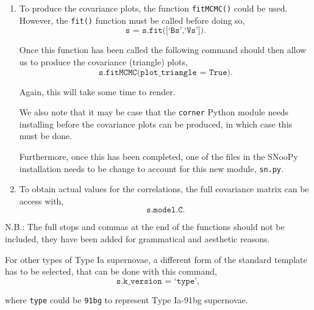 \documentclass[twocolumn]{revtex4}
\begin{document}
{\begin{enumerate}
 It is worth noting that as this is a more complex method, it is sampling multiple probabilities, it will take more time to render a final plot. 
 
 \item To produce the covariance plots, the function \texttt{fitMCMC()} could be used. However, the \texttt{fit()} function must be called before doing so,
 \begin{equation*}
 \texttt{s = s.fit([`Bs',`Vs'])} . 
 \end{equation*}
 
 Once this function has been called the following command should then allow us to produce the covariance (triangle) plots,
 \begin{equation*}
 \texttt{s.fitMCMC(plot\_triangle = True)} . 
 \end{equation*}
 
 Again, this will take some time to render. 
 
 We also note that it may be case that the \texttt{corner} Python module needs installing before the covariance plots can be produced, in which case this must be done. 
 
 Furthermore, once this has been completed, one of the files in the SNooPy installation needs to be change to account for this new module, \texttt{sn.py}.
 
 \item To obtain actual values for the correlations, the full covariance matrix can be access with, 
 \begin{equation*}
 \texttt{s.model.C}.
 \end{equation*}
\end{enumerate}

N.B.: The full stops and commas at the end of the functions should not be included, they have been added for grammatical and aesthetic reasons.

For other types of Type Ia supernovae, a different form of the standard template has to be selected, that can be done with this command,
\begin{equation*}
\texttt{s.k\_version = `type'},
\end{equation*}

where \texttt{type} could be \texttt{91bg} to represent Type Ia-91bg supernovae.

\clearpage

\onecolumngrid
\vspace{-3ex}
}
\end{document}
